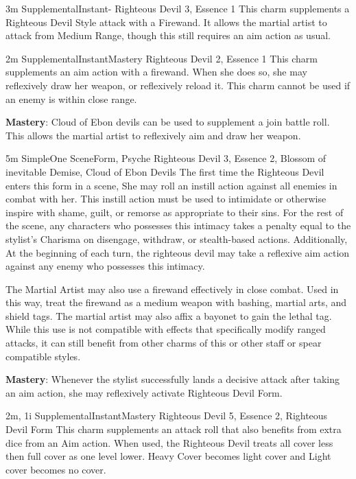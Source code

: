 
{3m}
{Supplemental}{Instant}{-}
{Righteous Devil 3, Essence 1}
This charm supplements a Righteous Devil Style attack with a Firewand.
It allows the martial artist to attack from Medium Range, though this still requires an aim action as usual.

{2m}
{Supplemental}{Instant}{Mastery}
{Righteous Devil 2, Essence 1}
This charm supplements an aim action with a firewand.
When she does so, she may reflexively draw her weapon, or reflexively reload it.
This charm cannot be used if an enemy is within close range.

\textbf{Mastery}: Cloud of Ebon devils can be used to supplement a join battle roll.
This allows the martial artist to reflexively aim and draw her weapon.

 
{5m}
{Simple}{One Scene}{Form, Psyche}
{Righteous Devil 3, Essence 2, Blossom of inevitable Demise, Cloud of Ebon Devils}
The first time the Righteous Devil enters this form in a scene,
She may roll an instill action against all enemies in combat with her.
This instill action must be used to intimidate or otherwise inspire with shame, guilt, or remorse as appropriate to their sins.
For the rest of the scene, any characters who possesses this intimacy takes a penalty equal to the stylist's Charisma on disengage, withdraw, or stealth-based actions.
Additionally, At the beginning of each turn, the righteous devil may take a reflexive aim action against any enemy who possesses this intimacy.

The Martial Artist may also use a firewand effectively in close combat.
Used in this way, treat the firewand as a medium weapon with bashing, martial arts, and shield tags.
The martial artist may also affix a bayonet to gain the lethal tag.
While this use is not compatible with effects that specifically modify ranged attacks, it can still benefit from other charms of this or other staff or spear compatible styles.

\textbf{Mastery}: Whenever the stylist successfully lands a decisive attack after taking an aim action,
she may reflexively activate Righteous Devil Form.

{2m, 1i}
{Supplemental}{Instant}{Mastery}
{Righteous Devil 5, Essence 2, Righteous Devil Form}
This charm supplements an attack roll that also benefits from extra dice from an Aim action.
When used, the Righteous Devil treats all cover less then full cover as one level lower.
Heavy Cover becomes light cover and Light cover becomes no cover.

